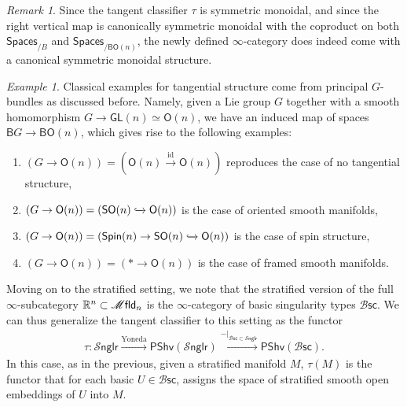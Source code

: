 \documentclass[12pt,a4paper]{article}
\newcounter{counter} \numberwithin{counter}{section}
\theoremstyle{definition}
\theoremstyle{plain}
\theoremstyle{remark}
\newtheorem{example}[counter]{Example}
\newtheorem{remark}[counter]{Remark}
\newcommand{\mfld}[1][s]{%
    \ifx r#1\mathsf{Mfld}\else
    \ifx s#1\mathscr{M} \mathsf{fld}\else
    \mathrm{Illegal~option}%
    \fi\fi
}
\newcommand{\bsc}{\mathscr{B} \mathsf{sc}}
\newcommand{\snglr}{\mathscr{S} \mathsf{nglr}}
\begin{document}
\begin{remark}
    Since the tangent classifier $\tau$ is symmetric monoidal, and since the right vertical map is canonically symmetric monoidal with the coproduct on both $\mathsf{Spaces}_{/B}$ and $\mathsf{Spaces}_{/\mathsf{BO}(n)}$, the newly defined $\infty$-category does indeed come with a canonical symmetric monoidal structure.
\end{remark}

\begin{example}
    Classical examples for tangential structure come from principal $G$-bundles as discussed before. Namely, given a Lie group $G$ together with a smooth homomorphism $G \rightarrow \mathsf{GL}(n) \simeq \mathsf{O}(n)$, we have an induced map of spaces $\mathsf{B}G \rightarrow \mathsf{BO}(n)$, which gives rise to the following examples:
    \begin{enumerate}
        \item $(G \rightarrow \mathsf{O}(n)) = (\mathsf{O}(n) \xrightarrow{\mathrm{id}} \mathsf{O}(n))$ reproduces the case of no tangential structure,
        \item $(G \rightarrow \mathsf{O}(n)) = (\mathsf{SO}(n) \xhookrightarrow{} \mathsf{O}(n))$ is the case of oriented smooth manifolds,
        \item $(G \rightarrow \mathsf{O}(n)) = (\mathsf{Spin}(n) \rightarrow \mathsf{SO}(n) \xhookrightarrow{} \mathsf{O}(n))$ is the case of spin structure,
        \item $(G \rightarrow \mathsf{O}(n)) = (* \rightarrow \mathsf{O}(n))$ is the case of framed smooth manifolds.
    \end{enumerate}
\end{example}

Moving on to the stratified setting, we note that the stratified version of the full $\infty$-subcategory $\mathbb{R}^n \subset \mfld_n$ is the $\infty$-category of basic singularity types $\bsc$. We can thus generalize the tangent classifier to this setting as the functor
%
\begin{align}
    \tau: \snglr \xrightarrow{\mathrm{Yoneda}} \mathsf{PShv}(\snglr) \xrightarrow{-|_{\bsc \subset \snglr}} \mathsf{PShv}(\bsc).
\end{align}
%
In this case, as in the previous, given a stratified manifold $M$, $\tau(M)$ is the functor that for each basic $U \in \bsc$, assigns the space of stratified smooth open embeddings of $U$ into $M$.
\end{document}
